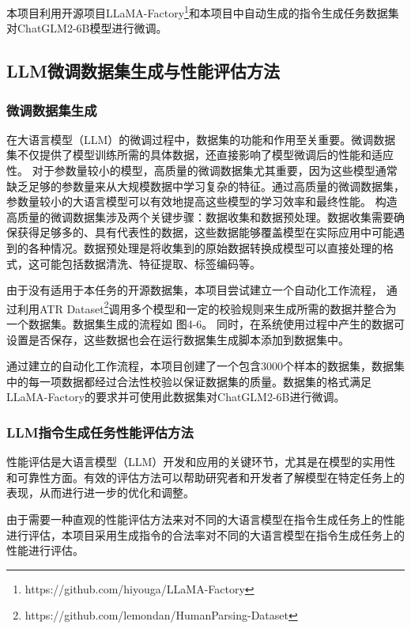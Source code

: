 \documentclass[a4paper,AutoFakeBold,oneside,12pt]{book}
\begin{document}
本项目利用开源项目LLaMA-Factory\footnote{https://github.com/hiyouga/LLaMA-Factory}和本项目中自动生成的指令生成任务数据集对ChatGLM2-6B模型进行微调。
\subsection{LLM微调数据集生成与性能评估方法}
\subsubsection{微调数据集生成}
在大语言模型（LLM）的微调过程中，数据集的功能和作用至关重要。微调数据集不仅提供了模型训练所需的具体数据，还直接影响了模型微调后的性能和适应性。
对于参数量较小的模型，高质量的微调数据集尤其重要，因为这些模型通常缺乏足够的参数量来从大规模数据中学习复杂的特征。通过高质量的微调数据集，参数量较小的大语言模型可以有效地提高这些模型的学习效率和最终性能。
构造高质量的微调数据集涉及两个关键步骤：数据收集和数据预处理。数据收集需要确保获得足够多的、具有代表性的数据，这些数据能够覆盖模型在实际应用中可能遇到的各种情况。数据预处理是将收集到的原始数据转换成模型可以直接处理的格式，这可能包括数据清洗、特征提取、标签编码等。

由于没有适用于本任务的开源数据集，本项目尝试建立一个自动化工作流程，
通过利用ATR Dataset\footnote{https://github.com/lemondan/HumanParsing-Dataset}调用多个模型和一定的校验规则来生成所需的数据并整合为一个数据集。数据集生成的流程如 图4-6。
同时，在系统使用过程中产生的数据可设置是否保存，这些数据也会在运行数据集生成脚本添加到数据集中。

通过建立的自动化工作流程，本项目创建了一个包含3000个样本的数据集，数据集中的每一项数据都经过合法性校验以保证数据集的质量。数据集的格式满足LLaMA-Factory的要求并可使用此数据集对ChatGLM2-6B进行微调。
\subsubsection{LLM指令生成任务性能评估方法}
性能评估是大语言模型（LLM）开发和应用的关键环节，尤其是在模型的实用性和可靠性方面。有效的评估方法可以帮助研究者和开发者了解模型在特定任务上的表现，从而进行进一步的优化和调整。

由于需要一种直观的性能评估方法来对不同的大语言模型在指令生成任务上的性能进行评估，本项目采用生成指令的合法率对不同的大语言模型在指令生成任务上的性能进行评估。
\end{document}
